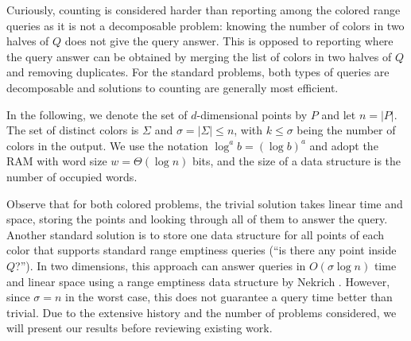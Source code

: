 Curiously, counting is considered harder than reporting among the colored range queries as it is not a decomposable problem: knowing the number of colors in two halves of $Q$ does not give the query answer. This is opposed to reporting where the query answer can be obtained by merging the list of colors in two halves of $Q$ and removing duplicates. For the standard problems, both types of queries are decomposable and solutions to counting are generally most efficient.

In the following, we denote the set of $d$-dimensional points by $P$ and let $n = |P|$. The set of distinct colors is $\Sigma$ and  $\sigma = |\Sigma| \leq n$, with $k \leq \sigma$ being the number of colors in the output. We use the notation $\log^a b = (\log b)^a$ and adopt the RAM with word size $w = \Theta(\log n)$ bits, and the size of a data structure is the number of occupied words. 

Observe that for both colored problems, the trivial solution takes linear time and space, storing the points and looking through all of them  to answer the query. Another standard solution is to store one data structure for all points of each color that supports standard range emptiness queries (``is there any point inside $Q$?''). In two dimensions, this approach can answer queries in $O(\sigma \log n)$ time and linear space using a range emptiness data structure by Nekrich \cite{nekrich2009orthogonal}.
However, since $\sigma = n$ in the worst case, this does not guarantee a query time better than trivial. 
Due to the extensive history and the number of problems considered, we will present our results before reviewing existing work.
%

